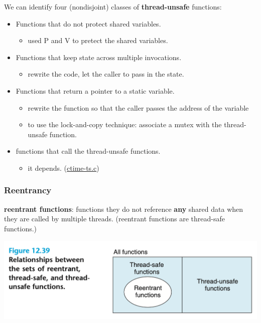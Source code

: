 \documentclass[11pt]{article}
\begin{document}
We can identify four (nondisjoint) classes of \textbf{thread-unsafe} functions:\\
\begin{itemize}
\item Functions that do not protect shared variables.\\
\begin{itemize}
\item used P and V to pretect the shared variables.\\
\end{itemize}
\item Functions that keep state across multiple invocations.\\
\begin{itemize}
\item rewrite the code, let the caller to pass in the state.\\
\end{itemize}
\item Functions that return a pointer to a static variable.\\
\begin{itemize}
\item rewrite the function so that the caller passes the address of the variable\\
\item to use the lock-and-copy technique: associate a mutex with the thread-unsafe function.\\
\end{itemize}
\item functions that call the thread-unsafe functions.\\
\begin{itemize}
\item it depends. (\href{code/c12-concurrent-programming/ctime-ts.c}{ctime-ts.c})\\
\end{itemize}
\end{itemize}


\subsubsection{Reentrancy}
\label{sec:org05a9153}

\textbf{reentrant functions}: functions they do not reference \textbf{any} shared data when they are called by multiple threads. (reentrant functions are thread-safe functions.)\\

\begin{center}
\includegraphics[width=.9\linewidth]{pics/figure12.39-relationships-between-the-sets-of-reentrant-thread-safe-and-thread-unsafe-functions.png}
\end{center}
\end{document}
